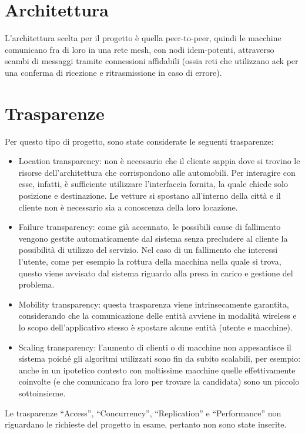 \section{Architettura}

L'architettura scelta per il progetto è quella peer-to-peer, quindi le macchine comunicano fra di loro in una rete mesh, con nodi idem-potenti, attraverso scambi di messaggi tramite connessioni affidabili (ossia reti che utilizzano ack per una conferma di ricezione e ritrasmissione in caso di errore).

\section{Trasparenze}\label{intro_trasparenze}

Per questo tipo di progetto, sono state considerate le seguenti trasparenze: 
\begin{itemize}
	\item Location transparency: non è necessario che il cliente sappia dove si trovino le risorse dell'architettura che corrispondono alle automobili. Per interagire con esse, infatti, è sufficiente utilizzare l'interfaccia fornita, la quale chiede solo posizione e destinazione. Le vetture si spostano all'interno della città e il cliente non è necessario sia a conoscenza della loro locazione.
	\item Failure transparency: come già accennato, le possibili cause di fallimento vengono gestite automaticamente dal sistema senza precludere al cliente la possibilità di utilizzo del servizio. Nel caso di un fallimento che interessi l'utente, come per esempio la rottura della macchina nella quale si trova, questo viene avvisato dal sistema riguardo alla presa in carico e gestione del problema.
	\item Mobility transparency: questa trasparenza viene intrinsecamente garantita, considerando che la comunicazione delle entità avviene in modalità wireless e lo scopo dell'applicativo stesso è spostare alcune entità (utente e macchine).
	\item Scaling transparency: l'aumento di clienti o di macchine non appesantisce il sistema poiché gli algoritmi utilizzati sono fin da subito scalabili, per esempio: anche in un ipotetico contesto con moltissime macchine quelle effettivamente coinvolte (e che comunicano fra loro per trovare la candidata) sono un piccolo sottoinsieme. 
\end{itemize}

Le trasparenze ``Access'', ``Concurrency'', ``Replication'' e ``Performance'' non riguardano le richieste del progetto in esame, pertanto non sono state inserite.

